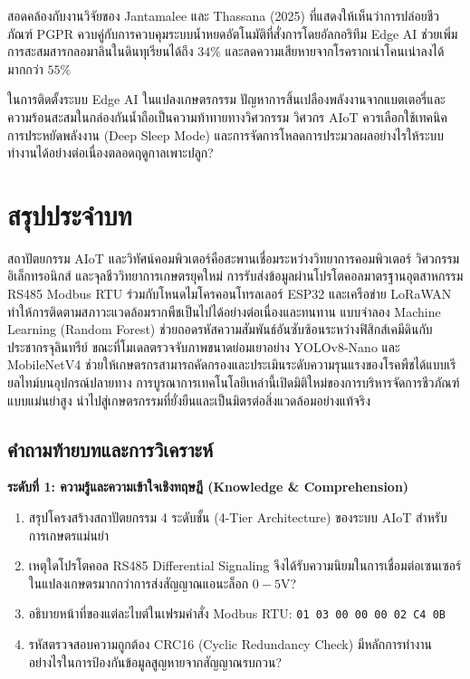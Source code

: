 สอดคล้องกับงานวิจัยของ Jantamalee และ Thassana (2025) \cite{jantamalee_2025} ที่แสดงให้เห็นว่าการปล่อยชีวภัณฑ์ PGPR ควบคู่กับการควบคุมระบบน้ำหยดอัตโนมัติที่สั่งการโดยอัลกอริทึม Edge AI ช่วยเพิ่มการสะสมสารกลอมาลินในดินทุเรียนได้ถึง $34\%$ และลดความเสียหายจากโรครากเน่าโคนเน่าลงได้มากกว่า $55\%$

\begin{insight}
ในการติดตั้งระบบ Edge AI ในแปลงเกษตรกรรม ปัญหาการสิ้นเปลืองพลังงานจากแบตเตอรี่และความร้อนสะสมในกล่องกันน้ำถือเป็นความท้าทายทางวิศวกรรม วิศวกร AIoT ควรเลือกใช้เทคนิคการประหยัดพลังงาน (Deep Sleep Mode) และการจัดการโหลดการประมวลผลอย่างไรให้ระบบทำงานได้อย่างต่อเนื่องตลอดฤดูกาลเพาะปลูก?
\end{insight}

\section*{สรุปประจำบท}

สถาปัตยกรรม AIoT และวิทัศน์คอมพิวเตอร์คือสะพานเชื่อมระหว่างวิทยาการคอมพิวเตอร์ วิศวกรรมอิเล็กทรอนิกส์ และจุลชีววิทยาการเกษตรยุคใหม่ การรับส่งข้อมูลผ่านโปรโตคอลมาตรฐานอุตสาหกรรม RS485 Modbus RTU ร่วมกับโหนดไมโครคอนโทรลเลอร์ ESP32 และเครือข่าย LoRaWAN ทำให้การติดตามสภาวะแวดล้อมรากพืชเป็นไปได้อย่างต่อเนื่องและทนทาน แบบจำลอง Machine Learning (Random Forest) ช่วยถอดรหัสความสัมพันธ์อันซับซ้อนระหว่างฟิสิกส์เคมีดินกับประชากรจุลินทรีย์ ขณะที่โมเดลตรวจจับภาพขนาดย่อมเยาอย่าง YOLOv8-Nano และ MobileNetV4 ช่วยให้เกษตรกรสามารถคัดกรองและประเมินระดับความรุนแรงของโรคพืชได้แบบเรียลไทม์บนอุปกรณ์ปลายทาง การบูรณาการเทคโนโลยีเหล่านี้เปิดมิติใหม่ของการบริหารจัดการชีวภัณฑ์แบบแม่นยำสูง นำไปสู่เกษตรกรรมที่ยั่งยืนและเป็นมิตรต่อสิ่งแวดล้อมอย่างแท้จริง

\subsection*{คำถามท้ายบทและการวิเคราะห์}

\noindent \textbf{ระดับที่ 1: ความรู้และความเข้าใจเชิงทฤษฎี (Knowledge \& Comprehension)}
\begin{enumerate}
    \item สรุปโครงสร้างสถาปัตยกรรม 4 ระดับชั้น (4-Tier Architecture) ของระบบ AIoT สำหรับการเกษตรแม่นยำ
    \item เหตุใดโปรโตคอล RS485 Differential Signaling จึงได้รับความนิยมในการเชื่อมต่อเซนเซอร์ในแปลงเกษตรมากกว่าการส่งสัญญาณแอนะล็อก $0-5\text{V}$?
    \item อธิบายหน้าที่ของแต่ละไบต์ในเฟรมคำสั่ง Modbus RTU: \texttt{01 03 00 00 00 02 C4 0B}
    \item รหัสตรวจสอบความถูกต้อง CRC16 (Cyclic Redundancy Check) มีหลักการทำงานอย่างไรในการป้องกันข้อมูลสูญหายจากสัญญาณรบกวน?
\end{enumerate}

